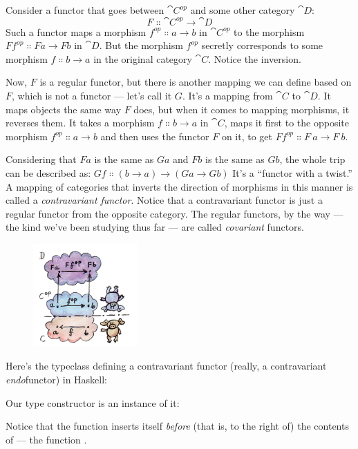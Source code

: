 Consider a functor that goes between $\cat{C}^{op}$ and
some other category $\cat{D}$:
\[F \Colon \cat{C}^{op} \to \cat{D}\]
Such a functor maps a morphism $f^{op} \Colon a \to b$ in
$\cat{C}^{op}$ to the morphism $F f^{op} \Colon F a \to F b$ in $\cat{D}$. But the morphism
$f^{op}$ secretly corresponds to some morphism
$f \Colon b \to a$ in the original category $\cat{C}$. Notice the
inversion.

Now, $F$ is a regular functor, but there is another mapping we can
define based on $F$, which is not a functor --- let's call it
$G$. It's a mapping from $\cat{C}$ to $\cat{D}$. It maps objects the
same way $F$ does, but when it comes to mapping morphisms, it
reverses them. It takes a morphism $f \Colon b \to a$ in $\cat{C}$, maps
it first to the opposite morphism $f^{op} \Colon a \to b$
and then uses the functor $F$ on it, to get $F f^{op} \Colon F\ a \to F\ b$.

Considering that $F a$ is the same as $G a$ and $F b$ is
the same as $G b$, the whole trip can be described as: $G f \Colon (b \to a) \to (G a \to G b)$
It's a ``functor with a twist.'' A mapping of categories that inverts
the direction of morphisms in this manner is called a
\emph{contravariant functor}. Notice that a contravariant functor is
just a regular functor from the opposite category. The regular functors,
by the way --- the kind we've been studying thus far --- are called
\emph{covariant} functors.

\begin{figure}[H]
\centering
\includegraphics[width=40mm]{images/contravariant.jpg}
\end{figure}

\noindent
Here's the typeclass defining a contravariant functor (really, a
contravariant \emph{endo}functor) in Haskell:

Our type constructor  is an instance of it:

Notice that the function  inserts itself \emph{before} (that
is, to the right of) the contents of  --- the function
.

